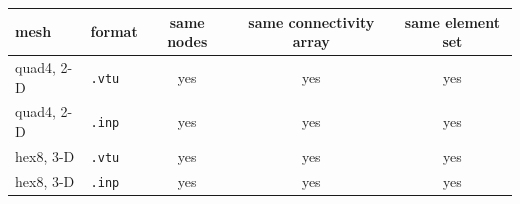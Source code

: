 \begin{tabular}{llccc}
\toprule
mesh & format & same nodes & same connectivity array & same element set \\
\midrule
quad4, 2-D & \texttt{.vtu} & yes & yes & yes \\
quad4, 2-D & \texttt{.inp} & yes & yes & yes \\
hex8, 3-D & \texttt{.vtu} & yes & yes & yes \\
hex8, 3-D & \texttt{.inp} & yes & yes & yes \\
\bottomrule
\end{tabular}
